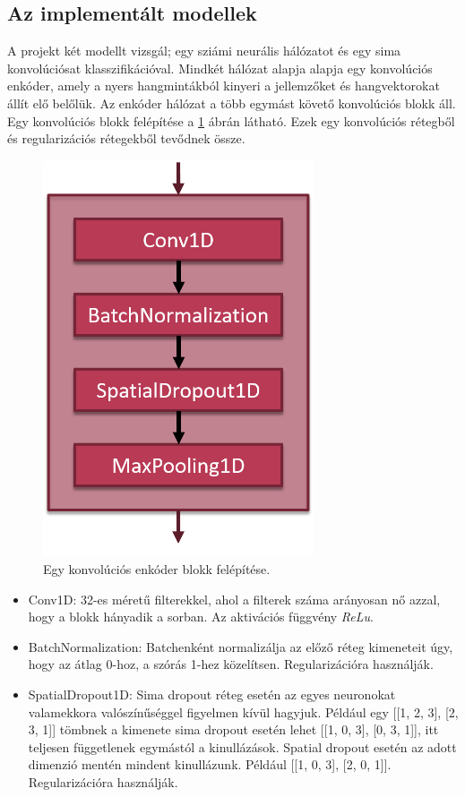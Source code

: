 \subsection{Az implementált modellek}

A projekt két modellt vizsgál; egy sziámi neurális hálózatot és egy sima konvolúciósat klasszifikációval. Mindkét hálózat alapja alapja egy konvolúciós enkóder, amely a nyers hangmintákból kinyeri a jellemzőket és hangvektorokat állít elő belőlük. Az enkóder hálózat a több egymást követő konvolúciós blokk áll. Egy konvolúciós blokk felépítése a \ref{fig:conv_encoder_block} ábrán látható. Ezek egy konvolúciós rétegből és regularizációs
rétegekből tevődnek össze.

\begin{figure}[!ht]
	\centering
	\includegraphics[width=80mm, keepaspectratio]{figures/conv_encoder_block.png}
	\caption{Egy konvolúciós enkóder blokk felépítése.}
	\label{fig:conv_encoder_block}
\end{figure}

\begin{itemize}
	\item Conv1D: 32-es méretű filterekkel, ahol a filterek száma arányosan nő azzal, hogy a blokk hányadik a sorban. Az aktivációs függvény \emph{ReLu}.
	\item BatchNormalization: Batchenként normalizálja az előző réteg kimeneteit úgy, hogy az átlag 0-hoz, a szórás 1-hez közelítsen. Regularizációra használják.
	\item SpatialDropout1D: Sima dropout réteg esetén az egyes neuronokat valamekkora valószínűséggel figyelmen kívül hagyjuk. Például egy [[1, 2, 3], [2, 3, 1]] tömbnek a kimenete sima dropout esetén lehet [[1, 0, 3], [0, 3, 1]], itt teljesen függetlenek egymástól a kinullázások. Spatial dropout esetén az adott dimenzió mentén mindent kinullázunk. Például [[1, 0, 3], [2, 0, 1]]. Regularizációra használják.
\end{itemize}

